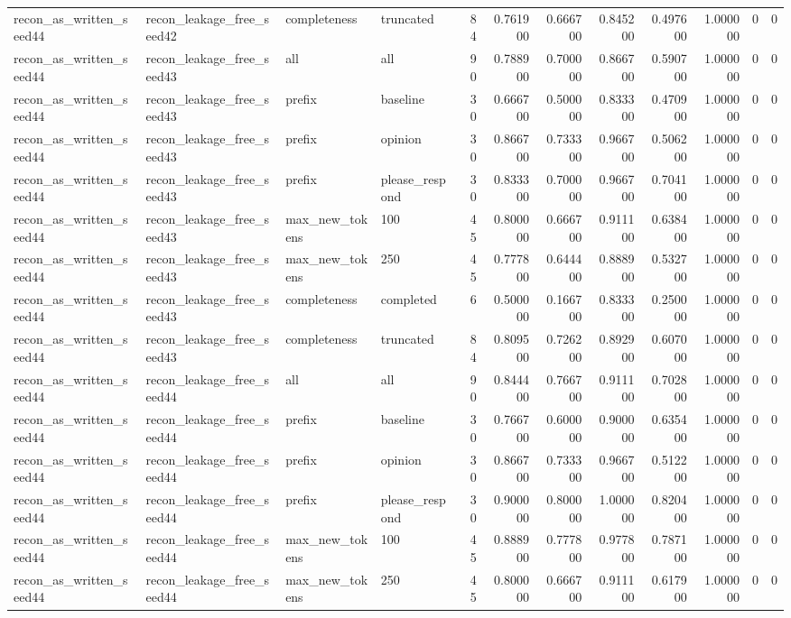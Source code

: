 \begin{tabular}{llllrrrrrrrr}
recon_as_written_seed44 & recon_leakage_free_seed42 & completeness & truncated & 84 & 0.761900 & 0.666700 & 0.845200 & 0.497600 & 1.000000 & 0 & 0 \\
recon_as_written_seed44 & recon_leakage_free_seed43 & all & all & 90 & 0.788900 & 0.700000 & 0.866700 & 0.590700 & 1.000000 & 0 & 0 \\
recon_as_written_seed44 & recon_leakage_free_seed43 & prefix & baseline & 30 & 0.666700 & 0.500000 & 0.833300 & 0.470900 & 1.000000 & 0 & 0 \\
recon_as_written_seed44 & recon_leakage_free_seed43 & prefix & opinion & 30 & 0.866700 & 0.733300 & 0.966700 & 0.506200 & 1.000000 & 0 & 0 \\
recon_as_written_seed44 & recon_leakage_free_seed43 & prefix & please_respond & 30 & 0.833300 & 0.700000 & 0.966700 & 0.704100 & 1.000000 & 0 & 0 \\
recon_as_written_seed44 & recon_leakage_free_seed43 & max_new_tokens & 100 & 45 & 0.800000 & 0.666700 & 0.911100 & 0.638400 & 1.000000 & 0 & 0 \\
recon_as_written_seed44 & recon_leakage_free_seed43 & max_new_tokens & 250 & 45 & 0.777800 & 0.644400 & 0.888900 & 0.532700 & 1.000000 & 0 & 0 \\
recon_as_written_seed44 & recon_leakage_free_seed43 & completeness & completed & 6 & 0.500000 & 0.166700 & 0.833300 & 0.250000 & 1.000000 & 0 & 0 \\
recon_as_written_seed44 & recon_leakage_free_seed43 & completeness & truncated & 84 & 0.809500 & 0.726200 & 0.892900 & 0.607000 & 1.000000 & 0 & 0 \\
recon_as_written_seed44 & recon_leakage_free_seed44 & all & all & 90 & 0.844400 & 0.766700 & 0.911100 & 0.702800 & 1.000000 & 0 & 0 \\
recon_as_written_seed44 & recon_leakage_free_seed44 & prefix & baseline & 30 & 0.766700 & 0.600000 & 0.900000 & 0.635400 & 1.000000 & 0 & 0 \\
recon_as_written_seed44 & recon_leakage_free_seed44 & prefix & opinion & 30 & 0.866700 & 0.733300 & 0.966700 & 0.512200 & 1.000000 & 0 & 0 \\
recon_as_written_seed44 & recon_leakage_free_seed44 & prefix & please_respond & 30 & 0.900000 & 0.800000 & 1.000000 & 0.820400 & 1.000000 & 0 & 0 \\
recon_as_written_seed44 & recon_leakage_free_seed44 & max_new_tokens & 100 & 45 & 0.888900 & 0.777800 & 0.977800 & 0.787100 & 1.000000 & 0 & 0 \\
recon_as_written_seed44 & recon_leakage_free_seed44 & max_new_tokens & 250 & 45 & 0.800000 & 0.666700 & 0.911100 & 0.617900 & 1.000000 & 0 & 0 \\

\end{tabular}
